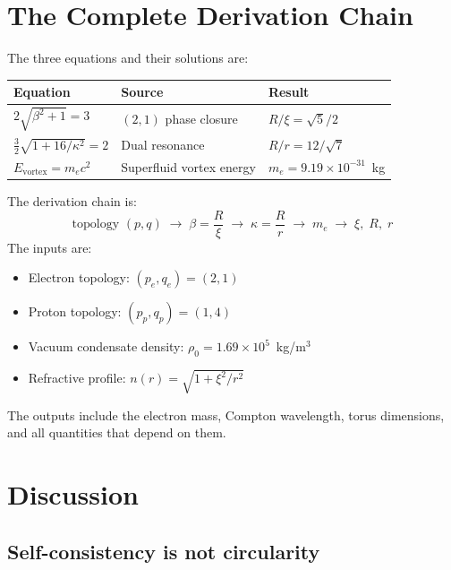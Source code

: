 \documentclass[11pt,a4paper]{article}
\begin{document}
\section{The Complete Derivation Chain}
\label{sec:chain}

The three equations and their solutions are:

\bigskip
\begin{center}
\begin{tabular}{lll}
\toprule
\textbf{Equation} & \textbf{Source} & \textbf{Result} \\
\midrule
$2\sqrt{\beta^2+1} = 3$
  & $(2,1)$ phase closure
  & $R/\xi = \sqrt{5}/2$ \\[4pt]
$\frac{3}{2}\sqrt{1+16/\kappa^2} = 2$
  & Dual resonance
  & $R/r = 12/\sqrt{7}$ \\[4pt]
$E_{\text{vortex}} = m_e c^2$
  & Superfluid vortex energy
  & $m_e = 9.19\times10^{-31}$~kg \\
\bottomrule
\end{tabular}
\end{center}
\bigskip

\noindent
The derivation chain is:
\[
\text{topology } (p,q) \;\longrightarrow\; \beta = \frac{R}{\xi}
\;\longrightarrow\; \kappa = \frac{R}{r}
\;\longrightarrow\; m_e
\;\longrightarrow\; \xi,\; R,\; r
\]
The inputs are:
\begin{itemize}
  \item Electron topology: $(p_e, q_e) = (2,1)$
  \item Proton topology: $(p_p, q_p) = (1,4)$
  \item Vacuum condensate density: $\rho_0 = 1.69 \times 10^5$~kg/m$^3$
  \item Refractive profile: $n(r) = \sqrt{1 + \xi^2/r^2}$
\end{itemize}
The outputs include the electron mass, Compton wavelength,
torus dimensions, and all quantities that depend on them.


\section{Discussion}
\label{sec:discussion}

\subsection{Self-consistency is not circularity}
\label{sec:circularity}
\end{document}
